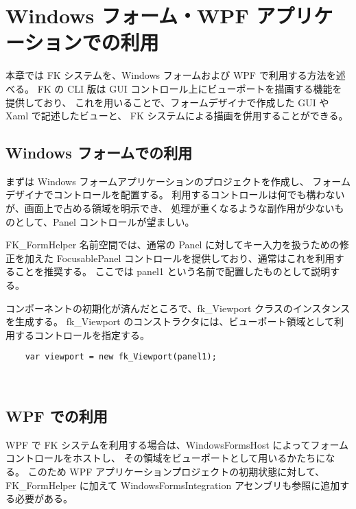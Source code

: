 \section{Windows フォーム・WPF アプリケーションでの利用}

本章では FK システムを、Windows フォームおよび WPF で利用する方法を述べる。
FK の CLI 版は GUI コントロール上にビューポートを描画する機能を提供しており、
これを用いることで、フォームデザイナで作成した GUI や Xaml で記述したビューと、
FK システムによる描画を併用することができる。

\subsection{Windows フォームでの利用}

まずは Windows フォームアプリケーションのプロジェクトを作成し、
フォームデザイナでコントロールを配置する。
利用するコントロールは何でも構わないが、画面上で占める領域を明示でき、
処理が重くなるような副作用が少ないものとして、Panel コントロールが望ましい。

FK\_FormHelper 名前空間では、通常の Panel に対してキー入力を扱うための修正を加えた 
FocusablePanel コントロールを提供しており、通常はこれを利用することを推奨する。
ここでは panel1 という名前で配置したものとして説明する。

コンポーネントの初期化が済んだところで、fk\_Viewport クラスのインスタンスを生成する。
fk\_Viewport のコンストラクタには、ビューポート領域として利用するコントロールを指定する。
\\
\begin{screen}
\begin{verbatim}
    var viewport = new fk_Viewport(panel1);
\end{verbatim}
\end{screen}
~

\subsection{WPF での利用}

WPF で FK システムを利用する場合は、WindowsFormsHost によってフォームコントロールをホストし、
その領域をビューポートとして用いるかたちになる。
このため WPF アプリケーションプロジェクトの初期状態に対して、
FK\_FormHelper に加えて WindowsFormsIntegration アセンブリも参照に追加する必要がある。

